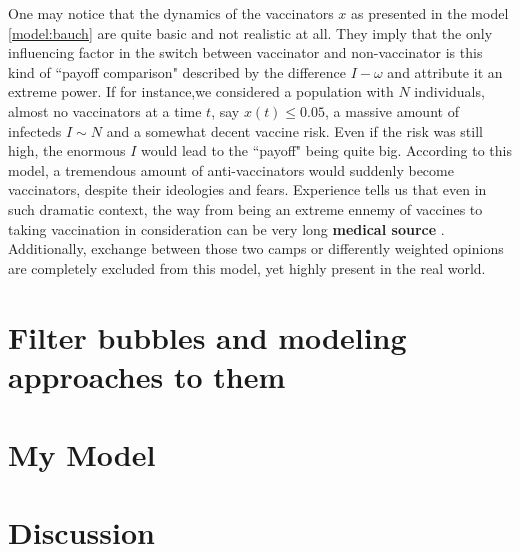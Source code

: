 \documentclass[12pt,a4paper,twoside]{article}
\begin{document}
One may notice that the dynamics of the vaccinators $x$ as presented in the model \eqref{model:bauch} are quite basic and not realistic at all. They imply that the only influencing factor in the switch between vaccinator and non-vaccinator is this kind of ``payoff comparison" described by the difference $I - \omega$ and attribute it an extreme power. If for instance,we considered a population with $N$ individuals, almost no vaccinators at a time $t$, say $x(t) \leq 0.05$, a massive amount of infecteds $I \sim N$ and a somewhat decent vaccine risk. Even if the risk was still high, the enormous $I$ would lead to the ``payoff" being quite big. According to this model, a tremendous amount of anti-vaccinators would suddenly become vaccinators, despite their ideologies and fears. Experience tells us that even in such dramatic context, the way from being an extreme ennemy of vaccines to taking vaccination in consideration can be very long %
\textbf{medical source}%
. Additionally, exchange between those two camps or differently weighted opinions are completely excluded from this model, yet highly present in the real world.

\section{Filter bubbles and modeling approaches to them}
\section{My Model}
\section{Discussion}

\newpage
\printbibliography
\end{document}
